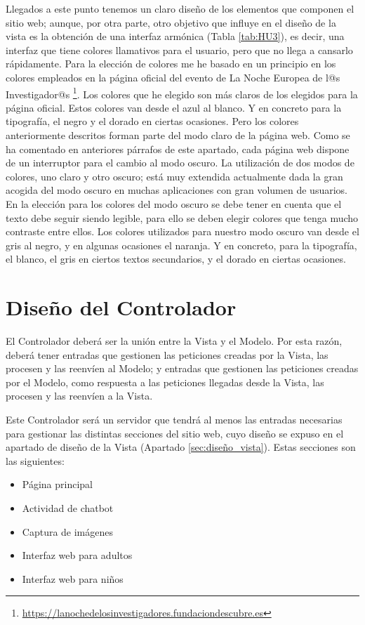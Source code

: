 Llegados a este punto tenemos un claro diseño de los elementos que componen el sitio web; aunque, por otra parte, otro objetivo que influye en el diseño de la vista es la obtención de una interfaz armónica (Tabla \ref{tab:HU3}), es decir, una interfaz que tiene colores llamativos para el usuario, pero que no llega a cansarlo rápidamente. Para la elección de colores me he basado en un principio en los colores empleados en la página oficial del evento de La Noche Europea de l@s Investigador@s \footnote{\url{https://lanochedelosinvestigadores.fundaciondescubre.es}}. Los colores que he elegido son más claros de los elegidos para la página oficial. Estos colores van desde el azul al blanco. Y en concreto para la tipografía, el negro y el dorado en ciertas ocasiones. Pero los colores anteriormente descritos forman parte del modo claro de la página web. Como se ha comentado en anteriores párrafos de este apartado, cada página web dispone de un interruptor para el cambio al modo oscuro. La utilización de dos modos de colores, uno claro y otro oscuro; está muy extendida actualmente dada la gran acogida del modo oscuro en muchas aplicaciones con gran volumen de usuarios. En la elección para los colores del modo oscuro se debe tener en cuenta que el texto debe seguir siendo legible, para ello se deben elegir colores que tenga mucho contraste entre ellos. Los colores utilizados para nuestro modo oscuro van desde el gris al negro, y en algunas ocasiones el naranja. Y en concreto, para la tipografía, el blanco, el gris en ciertos textos secundarios, y el dorado en ciertas ocasiones.

\section{Diseño del Controlador}

El Controlador deberá ser la unión entre la Vista y el Modelo. Por esta razón, deberá tener entradas que gestionen las peticiones creadas por la Vista, las procesen y las reenvíen al Modelo; y entradas que gestionen las peticiones creadas por el Modelo, como respuesta a las peticiones llegadas desde la Vista, las procesen y las reenvíen a la Vista.

Este Controlador será un servidor que tendrá al menos las entradas necesarias para gestionar las distintas secciones del sitio web, cuyo diseño se expuso en el apartado de diseño de la Vista (Apartado \ref{sec:diseño_vista}). Estas secciones son las siguientes:

\begin{itemize}
\item Página principal
\item Actividad de chatbot
\item Captura de imágenes
\item Interfaz web para adultos
\item Interfaz web para niños
\end{itemize}

